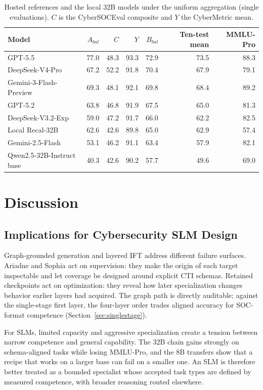 \documentclass[conference]{IEEEtran}
\begin{document}
\begin{table}[t]
\caption{Hosted references and the local 32B models under the uniform aggregation (single evaluations). $C$ is the CyberSOCEval composite and $Y$ the CyberMetric mean.}
\label{tab:hosted}
\centering
\footnotesize
\setlength{\tabcolsep}{4.0pt}
\begin{tabular}{@{}lrrrrrr@{}}
\toprule
Model & $A_{bal}$ & $C$ & $Y$ & $B_{bal}$ & Ten-test mean & MMLU-Pro \\
\midrule
GPT-5.5 & 77.0 & 48.3 & 93.3 & 72.9 & 73.5 & 88.3 \\
DeepSeek-V4-Pro & 67.2 & 52.2 & 91.8 & 70.4 & 67.9 & 79.1 \\
Gemini-3-Flash-Preview & 69.3 & 48.1 & 92.1 & 69.8 & 68.4 & 89.2 \\
GPT-5.2 & 63.8 & 46.8 & 91.9 & 67.5 & 65.0 & 81.3 \\
DeepSeek-V3.2-Exp & 59.0 & 47.2 & 91.7 & 66.0 & 62.2 & 82.5 \\
Local Recal-32B & 62.6 & 42.6 & 89.8 & 65.0 & 62.9 & 57.4 \\
Gemini-2.5-Flash & 53.1 & 46.2 & 91.1 & 63.4 & 57.9 & 82.1 \\
Qwen2.5-32B-Instruct base & 40.3 & 42.6 & 90.2 & 57.7 & 49.6 & 69.0 \\
\bottomrule
\end{tabular}
\end{table}

\section{Discussion}\label{sec:discussion}
\subsection{Implications for Cybersecurity SLM Design}
Graph-grounded generation and layered IFT address different failure surfaces. Ariadne and Sophia act on supervision: they make the origin of each target inspectable and let coverage be designed around explicit CTI schemas. Retained checkpoints act on optimization: they reveal how later specialization changes behavior earlier layers had acquired. The graph path is directly auditable; against the single-stage first layer, the four-layer order trades aligned accuracy for SOC-format competence (Section~\ref{sec:singlestage}).

For SLMs, limited capacity and aggressive specialization create a tension between narrow competence and general capability. The 32B chain gains strongly on schema-aligned tasks while losing MMLU-Pro, and the 8B transfers show that a recipe that works on a larger base can fail on a smaller one. An SLM is therefore better treated as a bounded specialist whose accepted task types are defined by measured competence, with broader reasoning routed elsewhere.
\end{document}
